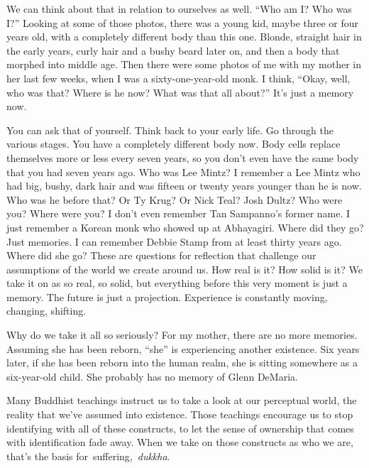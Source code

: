 \enlargethispage{1\baselineskip}
We can think about that in relation to ourselves as well. ``Who am I? Who was I?'' Looking at some of those photos, there was a young kid, maybe three or four years old, with a completely different body than this one. Blonde, straight hair in the early years, curly hair and a bushy beard later on, and then a body that morphed into middle age. Then there were some photos of me with my mother in her last few weeks, when I was a sixty-one-year-old monk. I think, ``Okay, well, who was that? Where is he now? What was that all about?'' It's just a memory now.

You can ask that of yourself. Think back to your early life. Go through the various stages. You have a completely different body now. Body cells replace themselves more or less every seven years, so you don't even have the same body that you had seven years ago. Who was Lee Mintz? I remember a Lee Mintz who had big, bushy, dark hair and was fifteen or twenty years younger than he is now. Who was he before that? Or Ty Krug? Or Nick Teal? Josh Dultz? Who were you? Where were you? I don't even remember Tan Sampanno's former name. I just remember a Korean monk who showed up at Abhayagiri. Where did they go? Just memories. I can remember Debbie Stamp from at least thirty years ago. Where did she go? These are questions for reflection that challenge our assumptions of the world we create around us. How real is it? How solid is it? We take it on as so real, so solid, but everything before this very moment is just a memory. The future is just a projection. Experience is constantly moving, changing, shifting.

Why do we take it all so seriously? For my mother, there are no more memories. Assuming she has been reborn, ``she'' is experiencing another existence. Six years later, if she has been reborn into the human realm, she is sitting somewhere as a six-year-old child. She probably has no memory of Glenn DeMaria.

Many Buddhist teachings instruct us to take a look at our perceptual world, the reality that we've assumed into existence. Those teachings encourage us to stop identifying with all of these constructs, to let the sense of ownership that comes with identification fade away. When we take on those constructs as who we are, that's the basis \mbox{for suffering, \emph{dukkha}.}

